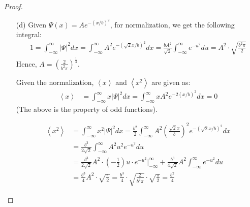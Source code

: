 \documentclass{article}
\begin{document}
\begin{proof}
\begin{itemize}
        \item[(d)] Given $\Psi(x)=Ae^{-(x/b)^2}$, for normalization, we get the following integral:
        \begin{align}
            1=\int_{-\infty}^{\infty}|\Psi|^2dx = \int_{-\infty}^{\infty}A^2e^{-(\sqrt{2}x/b)^2}dx = \frac{bA^2}{\sqrt{2}}\int_{-\infty}^{\infty}e^{-u^2}du = A^2\cdot \sqrt{\frac{b^2\pi}{2}}
        \end{align}
        Hence, $A=\left(\frac{2}{b^2\pi}\right)^\frac{1}{4}$.

        \hfil

        Given the normalization, $\left<x\right>$ and $\left<x^2\right>$ are given as:
        \begin{align}
            \left<x\right>&=\int_{-\infty}^{\infty}x|\Psi|^2dx = \int_{-\infty}^{\infty}xA^2e^{-2(x/b)^2}dx = 0
        \end{align}
        (The above is the property of odd functions).

        \begin{align}
            \left<x^2\right>&=\int_{-\infty}^{\infty}x^2|\Psi|^2dx = \frac{b^2}{2}\int_{-\infty}^{\infty}A^2\left(\frac{\sqrt{2}x}{b}\right)^2e^{-(\sqrt{2}x/b)^2}dx\\
            &= \frac{b^3}{2\sqrt{2}}\int_{-\infty}^{\infty}A^2 u^2e^{-u^2}du\\\
            &= \frac{b^3}{2\sqrt{2}}A^2\cdot\left(-\frac{1}{2}\right)u\cdot e^{-u^2}\bigg|_{-\infty}^{\infty}+\frac{b^3}{4\sqrt{2}}A^2\int_{-\infty}^{\infty}e^{-u^2}du\\
            &= \frac{b^3}{4}A^2\cdot\sqrt{\frac{\pi}{2}}=\frac{b^3}{4}\cdot\sqrt{\frac{2}{b^2\pi}}\cdot\sqrt{\frac{\pi}{2}}=\frac{b^2}{4}
        \end{align}
    \end{itemize}
\end{proof}

\newpage
\end{document}
